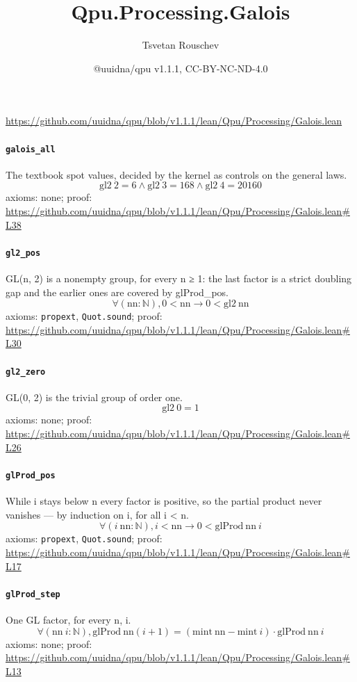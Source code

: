 \documentclass[11pt]{article}
\title{Qpu.Processing.Galois}
\author{Tsvetan Rouschev}
\date{@uuidna/qpu v1.1.1, CC-BY-NC-ND-4.0}
\begin{document}
\maketitle
\noindent\url{https://github.com/uuidna/qpu/blob/v1.1.1/lean/Qpu/Processing/Galois.lean}

\paragraph{\texttt{galois\_all}}
The textbook spot values, decided by the kernel as controls on the general laws.
\[ \mathrm{gl2}\ 2 = 6 \land \mathrm{gl2}\ 3 = 168 \land \mathrm{gl2}\ 4 = 20160 \]
\noindent axioms: none; proof: \url{https://github.com/uuidna/qpu/blob/v1.1.1/lean/Qpu/Processing/Galois.lean\#L38}

\paragraph{\texttt{gl2\_pos}}
GL(n, 2) is a nonempty group, for every n ≥ 1: the last factor is a strict doubling gap and the earlier ones are covered by glProd\_pos.
\[ \forall (\mathrm{nn} : \mathbb{N}), 0 < \mathrm{nn} \to 0 < \mathrm{gl2}\ \mathrm{nn} \]
\noindent axioms: \texttt{propext}, \texttt{Quot.sound}; proof: \url{https://github.com/uuidna/qpu/blob/v1.1.1/lean/Qpu/Processing/Galois.lean\#L30}

\paragraph{\texttt{gl2\_zero}}
GL(0, 2) is the trivial group of order one.
\[ \mathrm{gl2}\ 0 = 1 \]
\noindent axioms: none; proof: \url{https://github.com/uuidna/qpu/blob/v1.1.1/lean/Qpu/Processing/Galois.lean\#L26}

\paragraph{\texttt{glProd\_pos}}
While i stays below n every factor is positive, so the partial product never vanishes — by induction on i, for all i < n.
\[ \forall (i\ \mathrm{nn} : \mathbb{N}), i < \mathrm{nn} \to 0 < \mathrm{glProd}\ \mathrm{nn}\ i \]
\noindent axioms: \texttt{propext}, \texttt{Quot.sound}; proof: \url{https://github.com/uuidna/qpu/blob/v1.1.1/lean/Qpu/Processing/Galois.lean\#L17}

\paragraph{\texttt{glProd\_step}}
One GL factor, for every n, i.
\[ \forall (\mathrm{nn}\ i : \mathbb{N}), \mathrm{glProd}\ \mathrm{nn} (i + 1) = (\mathrm{mint}\ \mathrm{nn} - \mathrm{mint}\ i) \cdot \mathrm{glProd}\ \mathrm{nn}\ i \]
\noindent axioms: none; proof: \url{https://github.com/uuidna/qpu/blob/v1.1.1/lean/Qpu/Processing/Galois.lean\#L13}
\end{document}
